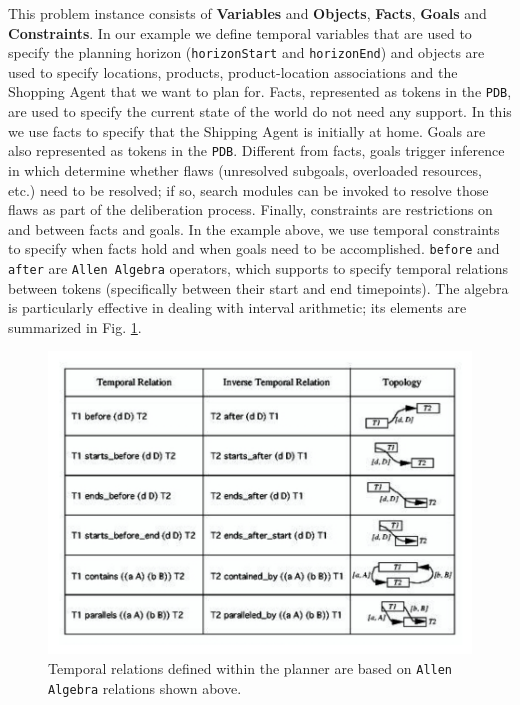 This problem instance consists of \textbf{Variables} and
\textbf{Objects}, \textbf{Facts}, \textbf{Goals} and
\textbf{Constraints}. In our example we define temporal variables that
are used to specify the planning horizon (\texttt{horizonStart} and
\texttt{horizonEnd}) and objects are used to specify locations,
products, product-location associations and the Shopping Agent that we
want to plan for. Facts, represented as tokens in the \texttt{PDB},
are used to specify the current state of the world  do
not need any support. In this  we use facts to
specify that the Shipping Agent is initially at home. Goals are also
represented as tokens in the \texttt{PDB}. Different from facts, goals
trigger inference in \eu which determine whether flaws (unresolved
subgoals, overloaded resources, etc.) need to be resolved; if so,
search modules can be invoked to resolve those flaws as part of the
deliberation process. Finally, constraints are restrictions on and
between facts and goals. In the example above, we use temporal
constraints to specify when facts hold and when goals need to be
accomplished. \texttt{before} and \texttt{after} are \texttt{Allen
  Algebra} \cite{allen84} operators, which \eu supports to specify
temporal relations between tokens (specifically between their start
and end timepoints). The algebra is particularly effective in dealing
with interval arithmetic; its elements are summarized in
Fig. \ref{fig:allen-algebra}.

\begin{figure}[!t]
\centering
\includegraphics[scale=2.3]{figs/Allen-algebra.jpeg}
\caption{\small Temporal relations defined within the planner are
  based on \texttt{Allen Algebra} \cite{allen84} relations shown
  above.}
\label{fig:allen-algebra}
\end{figure}


